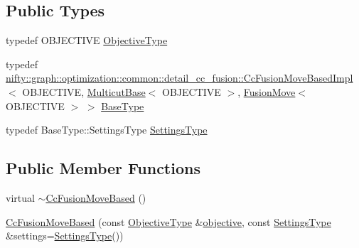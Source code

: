 \subsection*{Public Types}
\begin{DoxyCompactItemize}
\item 
typedef O\+B\+J\+E\+C\+T\+I\+V\+E \hyperlink{classnifty_1_1graph_1_1optimization_1_1multicut_1_1CcFusionMoveBased_a93a84a03fe150339ecfbc79916116fbd}{Objective\+Type}
\item 
typedef \hyperlink{classnifty_1_1graph_1_1optimization_1_1common_1_1detail__cc__fusion_1_1CcFusionMoveBasedImpl}{nifty\+::graph\+::optimization\+::common\+::detail\+\_\+cc\+\_\+fusion\+::\+Cc\+Fusion\+Move\+Based\+Impl}$<$ O\+B\+J\+E\+C\+T\+I\+V\+E, \hyperlink{classnifty_1_1graph_1_1optimization_1_1multicut_1_1MulticutBase}{Multicut\+Base}$<$ O\+B\+J\+E\+C\+T\+I\+V\+E $>$, \hyperlink{classnifty_1_1graph_1_1optimization_1_1multicut_1_1FusionMove}{Fusion\+Move}$<$ O\+B\+J\+E\+C\+T\+I\+V\+E $>$ $>$ \hyperlink{classnifty_1_1graph_1_1optimization_1_1multicut_1_1CcFusionMoveBased_aa99b0cee088cc7147b43337e08f88437}{Base\+Type}
\item 
typedef Base\+Type\+::\+Settings\+Type \hyperlink{classnifty_1_1graph_1_1optimization_1_1multicut_1_1CcFusionMoveBased_adaf2321e46f363a92a0593f6ec93ef0e}{Settings\+Type}
\end{DoxyCompactItemize}
\subsection*{Public Member Functions}
\begin{DoxyCompactItemize}
\item 
virtual \hyperlink{classnifty_1_1graph_1_1optimization_1_1multicut_1_1CcFusionMoveBased_ab766e79bc1588d4dbe805c225cdbb161}{$\sim$\+Cc\+Fusion\+Move\+Based} ()
\item 
\hyperlink{classnifty_1_1graph_1_1optimization_1_1multicut_1_1CcFusionMoveBased_a6721da9e9fd831d916d75f2f2a45f5ca}{Cc\+Fusion\+Move\+Based} (const \hyperlink{classnifty_1_1graph_1_1optimization_1_1multicut_1_1CcFusionMoveBased_a93a84a03fe150339ecfbc79916116fbd}{Objective\+Type} \&\hyperlink{classnifty_1_1graph_1_1optimization_1_1common_1_1detail__cc__fusion_1_1CcFusionMoveBasedImpl_ad97005b4bf8bd030c06759e90ca8bbd3}{objective}, const \hyperlink{classnifty_1_1graph_1_1optimization_1_1multicut_1_1CcFusionMoveBased_adaf2321e46f363a92a0593f6ec93ef0e}{Settings\+Type} \&settings=\hyperlink{classnifty_1_1graph_1_1optimization_1_1multicut_1_1CcFusionMoveBased_adaf2321e46f363a92a0593f6ec93ef0e}{Settings\+Type}())
\end{DoxyCompactItemize}


